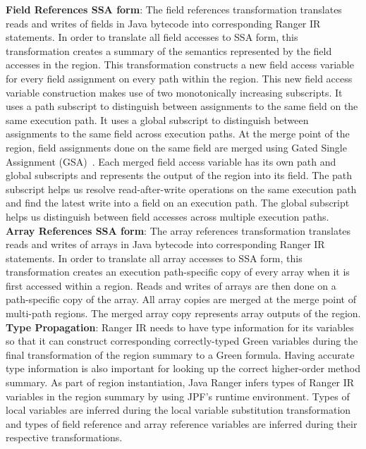 \textbf{Field References SSA form}: The field references transformation translates reads and writes of fields
in Java bytecode into corresponding Ranger IR statements.
%
In order to translate all field accesses to SSA form, this transformation creates a summary of the semantics
represented by the field accesses in the region.
%
This transformation constructs a new field access variable for every field assignment on every path within the region.
%
This new field access variable construction makes use of two monotonically increasing subscripts.
%
It uses a path subscript to distinguish between assignments to the same field on the same execution path.
%
It uses a global subscript to distinguish between assignments to the same field across execution paths.
%
At the merge point of the region, field assignments done on the same field are merged using
Gated Single Assignment (GSA)~\cite{Ottenstein1990}.
%
Each merged field access variable has its own path and global subscripts and represents the output of the region into
its field.
%
The path subscript helps us resolve read-after-write operations on the same execution path and find the latest write
into a field on an execution path.
%
The global subscript helps us distinguish between field accesses across multiple execution paths. \\
\textbf{Array References SSA form}: The array references transformation translates reads and writes of arrays in
Java bytecode into corresponding Ranger IR statements.
%
In order to translate all array accesses to SSA form, this transformation creates an execution path-specific copy of
every array when it is first accessed within a region.
%
Reads and writes of arrays are then done on a path-specific copy of the array.
%
All array copies are merged at the merge point of multi-path regions.
%
The merged array copy represents array outputs of the region.\\
\textbf{Type Propagation}: Ranger IR needs to have type information for its variables so that it can construct
corresponding correctly-typed Green variables during the final transformation of the region summary to a Green formula.
%
Having accurate type information is also important for looking up the correct higher-order method summary.
%
As part of region instantiation, Java Ranger infers types of Ranger IR variables in the region summary by
using JPF's runtime environment.
%
Types of local variables are inferred during the local variable substitution transformation and types of field reference
and array reference variables are inferred during their respective transformations.
